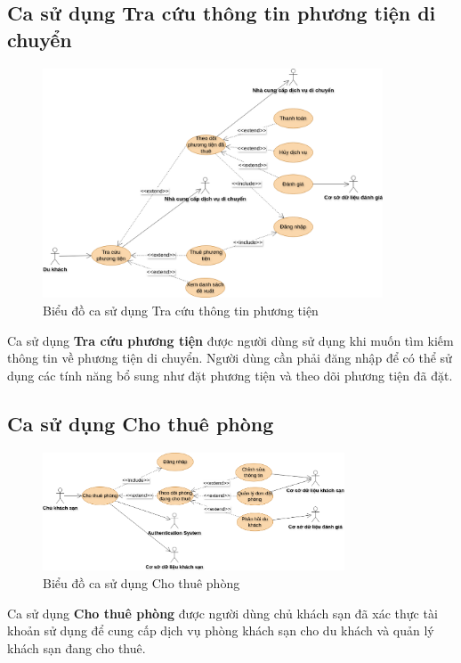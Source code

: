 \subsection{Ca sử dụng Tra cứu thông tin phương tiện di chuyển}
\begin{figure}[H]
    \centering
    \includegraphics[width=0.9\textwidth]{img/Use_Case-Tra cứu phương tiện.drawio.png}
    \caption{Biểu đồ ca sử dụng Tra cứu thông tin phương tiện}
\end{figure}
Ca sử dụng \textbf{Tra cứu phương tiện} được người dùng sử dụng khi muốn tìm kiếm thông tin về phương tiện di chuyển. Người dùng cần phải đăng nhập để có thể sử dụng các tính năng bổ sung như đặt phương tiện và theo dõi phương tiện đã đặt.

\subsection{Ca sử dụng Cho thuê phòng}
\begin{figure}[H]
    \centering
    \includegraphics[width=0.8\textwidth]{img/Use_Case-Cho thuê phòng.drawio.png}
    \caption{Biểu đồ ca sử dụng Cho thuê phòng}
\end{figure}
Ca sử dụng \textbf{Cho thuê phòng} được người dùng chủ khách sạn đã xác thực tài khoản sử dụng để cung cấp dịch vụ phòng khách sạn cho du khách và quản lý khách sạn đang cho thuê.

